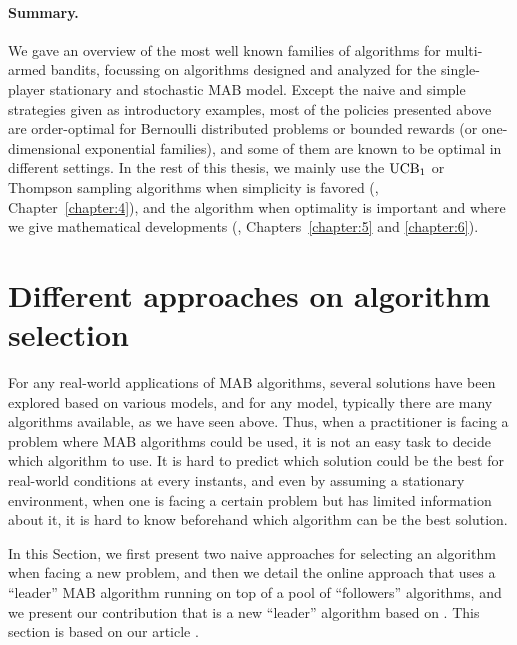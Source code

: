 

\paragraph{Summary.}
%
We gave an overview of the most well known families of algorithms for multi-armed bandits,
focussing on algorithms designed and analyzed for the single-player stationary and stochastic MAB model.
Except the naive and simple strategies given as introductory examples, most of the policies presented above are order-optimal for Bernoulli distributed problems or bounded rewards (or one-dimensional exponential families),
and some of them are known to be optimal in different settings.
%
In the rest of this thesis, we mainly use the $\mathrm{UCB}_1$ or Thompson sampling algorithms when simplicity is favored (\ie, Chapter~\ref{chapter:4}), and the \klUCB{} algorithm when optimality is important and where we give mathematical developments (\ie, Chapters~\ref{chapter:5} and \ref{chapter:6}).


\section{Different approaches on algorithm selection}
\label{sec:2:chooseYourPreferredBanditAlgorithm}

For any real-world applications of MAB algorithms,
several solutions have been explored based on various models, and for any model, typically there are many algorithms available, as we have seen above.
%
Thus, when a practitioner is facing a problem where MAB algorithms could be used, it is not an easy task to decide which algorithm to use.
It is hard to predict which solution could be the best for real-world conditions at every instants,
and even by assuming a stationary environment, when one is facing a certain problem but has limited information about it, it is hard to know beforehand which algorithm can be the best solution.

In this Section, we first present two naive approaches for selecting an algorithm when facing a new problem, and then we detail the online approach that uses a ``leader'' MAB algorithm running on top of a pool of ``followers'' algorithms, and we present our contribution that is a new ``leader'' algorithm based on \ExpQ.
This section is based on our article \cite{Besson2018WCNC}.


